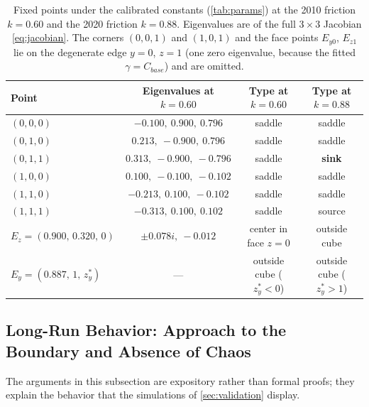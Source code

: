 \documentclass[10pt]{article}
\begin{document}
\begin{table}
\centering
\caption{Fixed points under the calibrated constants (\cref{tab:params}) at the 2010 friction $k=0.60$ and the 2020 friction $k=0.88$. Eigenvalues are of the full $3\times3$ Jacobian \eqref{eq:jacobian}. The corners $(0,0,1)$ and $(1,0,1)$ and the face points $E_{y0}$, $E_{z1}$ lie on the degenerate edge $y=0$, $z=1$ (one zero eigenvalue, because the fitted $\gamma=C_{base}$) and are omitted.}\label{tab:fixedpoints}
{\small
\begin{tabular}{@{}lccc@{}}
\toprule
Point & Eigenvalues at $k=0.60$ & Type at $k=0.60$ & Type at $k=0.88$ \\
\midrule
$(0,0,0)$ & $-0.100,\ 0.900,\ 0.796$ & saddle & saddle \\
$(0,1,0)$ & $0.213,\ -0.900,\ 0.796$ & saddle & saddle \\
$(0,1,1)$ & $0.313,\ -0.900,\ -0.796$ & saddle & \textbf{sink} \\
$(1,0,0)$ & $0.100,\ -0.100,\ -0.102$ & saddle & saddle \\
$(1,1,0)$ & $-0.213,\ 0.100,\ -0.102$ & saddle & saddle \\
$(1,1,1)$ & $-0.313,\ 0.100,\ 0.102$ & saddle & source \\
$E_z=(0.900,\,0.320,\,0)$ & $\pm0.078i,\ -0.012$ & center in face $z=0$ & outside cube \\
$E_y=(0.887,\,1,\,z_y^*)$ & --- & outside cube ($z_y^*<0$) & outside cube ($z_y^*>1$) \\
\bottomrule
\end{tabular}}
\end{table}

\subsection{Long-Run Behavior: Approach to the Boundary and Absence of Chaos}\label{sec:longrun}
The arguments in this subsection are expository rather than formal proofs; they explain the behavior that the simulations of \cref{sec:validation} display.
\end{document}
